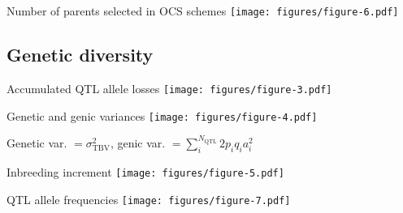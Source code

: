 \documentclass{beamer}
\begin{document}
\begin{frame}{Number of parents selected in OCS schemes}
  \texttt{[image: figures/figure-6.pdf]}
\end{frame}

\subsection{Genetic diversity}
\begin{frame}{Accumulated QTL allele losses}
  \texttt{[image: figures/figure-3.pdf]}
\end{frame}

\begin{frame}{Genetic and genic variances}
  \texttt{[image: figures/figure-4.pdf]}

  \tiny{Genetic var. $=\sigma_{\text{TBV}}^2$, genic var. $=\sum_i^{N_{\text{QTL}}}2p_iq_ia_i^2$}
\end{frame}

\begin{frame}{Inbreeding increment}
  \texttt{[image: figures/figure-5.pdf]}
\end{frame}

\begin{frame}{QTL allele frequencies}
  \texttt{[image: figures/figure-7.pdf]}
\end{frame}
\end{document}
